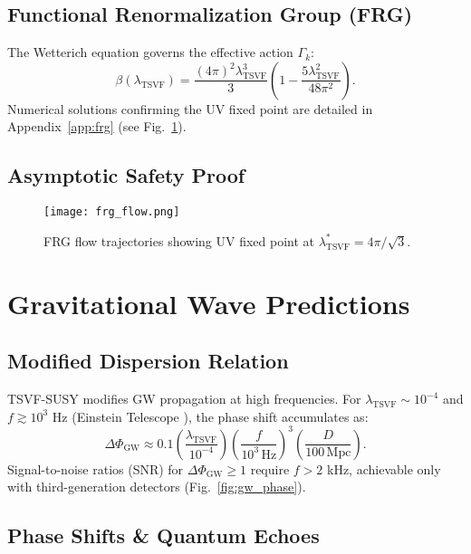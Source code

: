 \documentclass[twocolumn,superscriptaddress,floatfix]{revtex4-2}
\newcommand{\tsvf}{\lambda_{\text{TSVF}}}
\begin{document}
\subsection{Functional Renormalization Group (FRG)}  
\label{subsec:frg}  

The Wetterich equation governs the effective action \(\Gamma_k\):  
\begin{equation}  
\beta(\lambda_{\text{TSVF}}) = \frac{(4\pi)^2 \lambda_{\text{TSVF}}^3}{3} \left(1 - \frac{5\lambda_{\text{TSVF}}^2}{48\pi^2}\right). 
\end{equation}  
Numerical solutions confirming the UV fixed point are detailed in Appendix~\ref{app:frg} (see Fig.~\ref{fig:frg_flow}).    


\subsection{Asymptotic Safety Proof}  
\begin{figure}[htbp]  
\centering  
\texttt{[image: frg\_flow.png]}  
\caption{FRG flow trajectories showing UV fixed point at \(\tsvf^* = 4\pi/\sqrt{3}\).}  
\label{fig:frg_flow}  
\end{figure}  

\section{Gravitational Wave Predictions}  
\label{sec:gw}  

\subsection{Modified Dispersion Relation}  
\label{subsec:dispersion}  

TSVF-SUSY modifies GW propagation at high frequencies. For $\lambda_{\text{TSVF}} \sim 10^{-4}$ and $f \gtrsim 10^3$ Hz (Einstein Telescope \cite{Punturo2010}), the phase shift accumulates as:
\begin{equation}
\Delta\Phi_{\text{GW}} \approx 0.1 \left(\frac{\lambda_{\text{TSVF}}}{10^{-4}}\right)\left(\frac{f}{10^3\,\text{Hz}}\right)^3\left(\frac{D}{100\,\text{Mpc}}\right).
\end{equation}
Signal-to-noise ratios (SNR) for $\Delta\Phi_{\text{GW}} \geq 1$ require $f > 2$ kHz, achievable only with third-generation detectors (Fig.~\ref{fig:gw_phase}).  

\subsection{Phase Shifts \& Quantum Echoes}  
\label{subsec:phase_echoes}  
\end{document}
